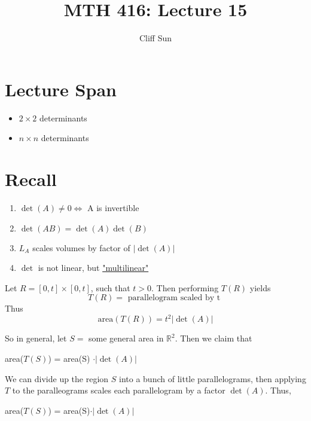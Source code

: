 \documentclass{article}
\title{MTH 416: Lecture 15}
\author{Cliff Sun}
\newtheorem{one minute paper}[theorem]{One Minute Paper}
\begin{document}
\maketitle

\section*{Lecture Span}
\begin{itemize}
    \item $2 \times 2$ determinants
    \item $n \times n$ determinants
\end{itemize}

\section*{Recall}

\begin{enumerate}
    \item $\det(A) \neq 0 \iff$ A is invertible
    \item $\det(AB) = \det(A)\det(B)$
    \item $L_A$ scales volumes by factor of $|\det(A)|$
    \item $\det$ is not linear, but \underline{"multilinear"}
\end{enumerate}

Let $R = [0,t]\times [0,t]$, such that $t > 0$. Then performing $T(R)$ yields
\begin{equation}
    T(R) = \text{ parallelogram scaled by t }
\end{equation}
Thus 
\begin{equation}
    \text{area}(T(R)) = t^2|\det(A)|
\end{equation}

So in general, let $S = $ some general area in $\mathbb{R}^2$. Then we claim that 
\begin{center}
    area($T(S)$) = area(S) $\cdot |\det(A)|$
\end{center}

We can divide up the region $S$ into a bunch of little parallelograms, then applying $T$ to the paralleograms scales each parallelogram by a factor $\det(A)$. Thus,
\begin{center}
    area($T(S)$) = area(S)$\cdot |\det(A)|$
\end{center}
\end{document}
